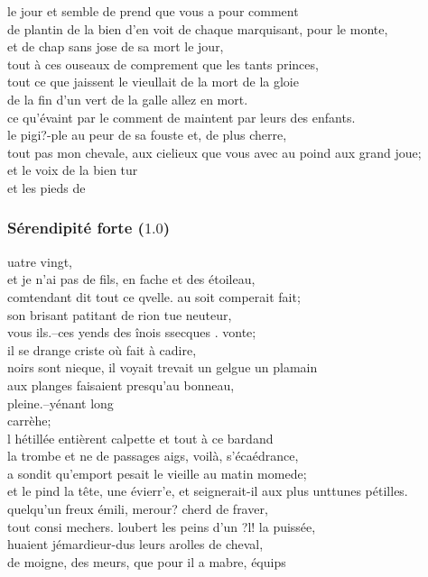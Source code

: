 \documentclass{article}
\begin{document}
				le jour et semble de prend que vous a pour comment\\
				de plantin de la bien d'en voit de chaque marquisant, pour le monte,\\
				et de chap sans jose de sa mort le jour,\\
				tout à ces ouseaux de comprement que les tants princes,\\
				tout ce que jaissent le vieullait de la mort de la gloie\\
				de la fin d'un vert de la galle allez en mort.\\
				ce qu'évaint par le comment de maintent par leurs des enfants.\\
				le pigi?-ple au peur de sa fouste et, de plus cherre,\\
				tout pas mon chevale, aux cielieux que vous avec au poind aux grand joue;\\
				et le voix de la bien tur\\
				et les pieds de \\
			\subsubsection{Sérendipité forte ($1.0$)}
				uatre vingt,\\
				et je n'ai pas de fils, en fache et des étoileau,\\
				comtendant dit tout ce qvelle. au soit comperait fait;\\
				son brisant patitant de rion tue neuteur,\\
				vous ils.--ces yends des înois ssecques . vonte;\\
				il se drange criste où fait à cadire,\\
				noirs sont nieque, il voyait trevait un gelgue un plamain\\
				aux planges faisaient presqu'au bonneau,\\
				pleine.--yénant long\\
				carrèhe;\\
				l hétillée entièrent calpette et tout à ce bardand\\
				la trombe et ne de passages aigs, voilà, s'écaédrance,\\
				a sondit qu'emport pesait le vieille au matin momede;\\
				et le pind la tête, une évierr'e, et seignerait-il aux plus unttunes pétilles.\\
				quelqu'un freux émili, merour? cherd de fraver,\\
				tout consi mechers. loubert les peins d'un ?l! la puissée,\\
				huaient jémardieur-dus leurs arolles de cheval,\\
				de moigne, des meurs, que pour il a mabre, équips\\
				
\end{document}
